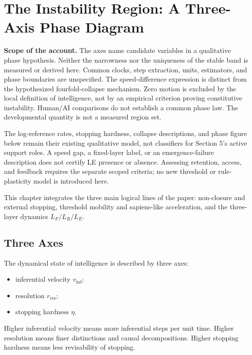 \section{The Instability Region: A Three-Axis Phase Diagram}

\noindent\textbf{Scope of the account.} The axes name candidate variables in a qualitative phase hypothesis. Neither the narrowness nor the uniqueness of the stable band is measured or derived here. Common clocks, step extraction, units, estimators, and phase boundaries are unspecified. The speed-difference expression is distinct from the hypothesized fourfold-collapse mechanism. Zero motion is excluded by the local definition of intelligence, not by an empirical criterion proving constitutive instability. Human/AI comparisons do not establish a common phase law. The developmental quantity is not a measured region set.

The log-reference rates, stopping hardness, collapse descriptions, and phase figure below remain their existing qualitative model, not classifiers for Section 5's active support roles. A speed gap, a fixed-layer label, or an emergence-failure description does not certify LE presence or absence. Assessing retention, access, and feedback requires the separate scoped criteria; no new threshold or rule-plasticity model is introduced here.


This chapter integrates the three main logical lines of the paper: non-closure and external stopping, threshold mobility and sapiens-like acceleration, and the three-layer dynamics $L_F/L_R/L_E$.

\subsection{Three Axes}

The dynamical state of intelligence is described by three axes:
\begin{itemize}
\item inferential velocity $v_{\text{inf}}$;
\item resolution $r_{\text{res}}$;
\item stopping hardness $\eta$.
\end{itemize}

Higher inferential velocity means more inferential steps per unit time. Higher resolution means finer distinctions and causal decompositions. Higher stopping hardness means less revisability of stopping.

